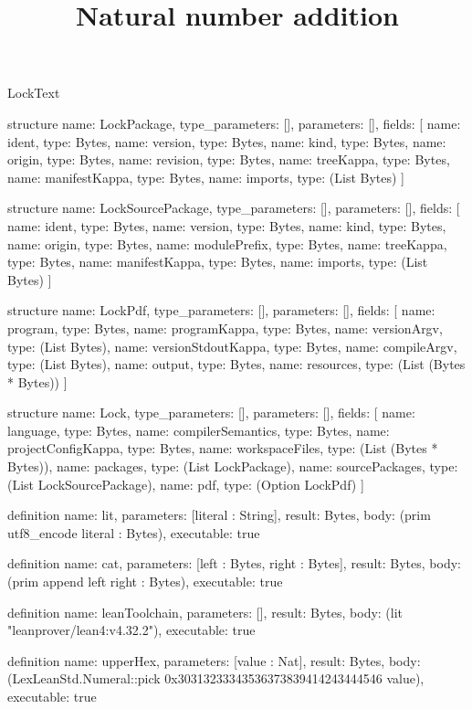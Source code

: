 \begin{lexlean}{LockText}
\title{Natural number addition}
\begin{semanticmodule}
structure{
  name: LockPackage,
  type_parameters: [],
  parameters: [],
  fields: [
    {name: ident, type: Bytes},
    {name: version, type: Bytes},
    {name: kind, type: Bytes},
    {name: origin, type: Bytes},
    {name: revision, type: Bytes},
    {name: treeKappa, type: Bytes},
    {name: manifestKappa, type: Bytes},
    {name: imports, type: (List Bytes)}
  ]
}

structure{
  name: LockSourcePackage,
  type_parameters: [],
  parameters: [],
  fields: [
    {name: ident, type: Bytes},
    {name: version, type: Bytes},
    {name: kind, type: Bytes},
    {name: origin, type: Bytes},
    {name: modulePrefix, type: Bytes},
    {name: treeKappa, type: Bytes},
    {name: manifestKappa, type: Bytes},
    {name: imports, type: (List Bytes)}
  ]
}

structure{
  name: LockPdf,
  type_parameters: [],
  parameters: [],
  fields: [
    {name: program, type: Bytes},
    {name: programKappa, type: Bytes},
    {name: versionArgv, type: (List Bytes)},
    {name: versionStdoutKappa, type: Bytes},
    {name: compileArgv, type: (List Bytes)},
    {name: output, type: Bytes},
    {name: resources, type: (List (Bytes * Bytes))}
  ]
}

structure{
  name: Lock,
  type_parameters: [],
  parameters: [],
  fields: [
    {name: language, type: Bytes},
    {name: compilerSemantics, type: Bytes},
    {name: projectConfigKappa, type: Bytes},
    {name: workspaceFiles, type: (List (Bytes * Bytes))},
    {name: packages, type: (List LockPackage)},
    {name: sourcePackages, type: (List LockSourcePackage)},
    {name: pdf, type: (Option LockPdf)}
  ]
}

definition{
  name: lit,
  parameters: [literal : String],
  result: Bytes,
  body: (prim utf8_encode literal : Bytes),
  executable: true
}

definition{
  name: cat,
  parameters: [left : Bytes, right : Bytes],
  result: Bytes,
  body: (prim append left right : Bytes),
  executable: true
}

definition{
  name: leanToolchain,
  parameters: [],
  result: Bytes,
  body: (lit "leanprover/lean4:v4.32.2"),
  executable: true
}

definition{
  name: upperHex,
  parameters: [value : Nat],
  result: Bytes,
  body: (LexLeanStd.Numeral::pick 0x30313233343536373839414243444546 value),
  executable: true
}


\end{semanticmodule}
\end{lexlean}
